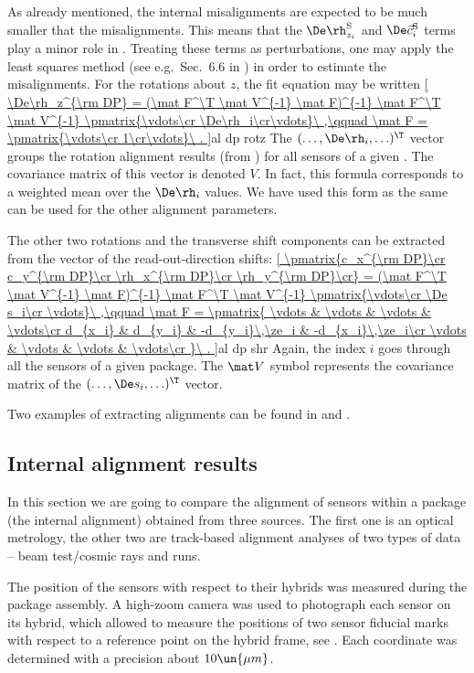 As already mentioned, the internal misalignments are expected to be much smaller that the  misalignments. This means that the $\De\rh_{z_i}^{\rm S}$ and $ \De\vec c_i^{\rm S}$ terms play a minor role in . Treating these terms as perturbations, one may apply the least squares method (see e.g.~Sec.~6.6 in ) in order to estimate the  misalignments. For the rotations about $z$, the fit equation may be written
\eqref{
	\De\rh_z^{\rm DP} = (\mat F^\T \mat V^{-1} \mat F)^{-1} \mat F^\T \mat V^{-1} \pmatrix{\vdots\cr \De\rh_i\cr\vdots}\ ,\qquad
	\mat F = \pmatrix{\vdots\cr 1\cr\vdots}\ .
}{al dp rotz}
The $(\ldots, \De\rh_i, \ldots)^\T$ vector groups the rotation alignment results (from ) for all sensors of a given . The covariance matrix of this vector is denoted $V$. In fact, this formula corresponds to a weighted mean over the $\De\rh_i$ values. We have used this form as the same can be used for the other  alignment parameters.

The other two  rotations and the transverse  shift components can be extracted from the vector of the read-out-direction shifts:
\eqref{
	\pmatrix{c_x^{\rm DP}\cr c_y^{\rm DP}\cr \rh_x^{\rm DP}\cr \rh_y^{\rm DP}\cr} =
	(\mat F^\T \mat V^{-1} \mat F)^{-1} \mat F^\T \mat V^{-1}
	\pmatrix{\vdots\cr \De s_i\cr \vdots}\ ,\qquad
	\mat F = \pmatrix{
		\vdots & \vdots & \vdots & \vdots\cr
		d_{x_i} & d_{y_i} & -d_{y_i}\,\ze_i & -d_{x_i}\,\ze_i\cr
		\vdots & \vdots & \vdots & \vdots\cr
	}\ .
}{al dp shr}
Again, the index $i$ goes through all the sensors of a given package. The $\mat V$ symbol represents the covariance matrix of the $(\ldots, \De s _i, \ldots)^\T$ vector.

Two examples of extracting  alignments can be found in  and .


\subsection[al int res]{Internal alignment results}

In this section we are going to compare the alignment of sensors within a package (the internal alignment) obtained from three sources. The first one is an optical metrology, the other two are track-based alignment analyses of two types of data -- beam test/cosmic rays and  runs.


The position of the sensors with respect to their hybrids was measured during the package assembly. A high-zoom camera was used to photograph each sensor on its hybrid, which allowed to measure the positions of two sensor fiducial marks with respect to a reference point on the hybrid frame, see . Each coordinate was determined with a precision about $10\un{\mu m}$.


